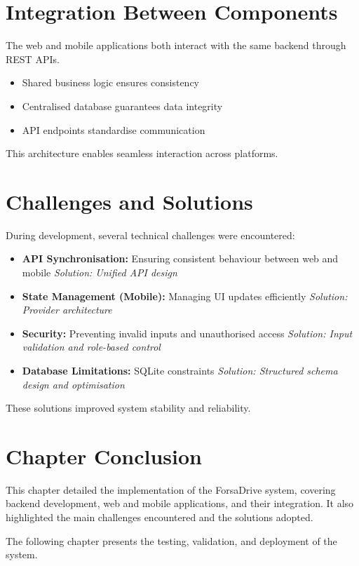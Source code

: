 \section{Integration Between Components}

The web and mobile applications both interact with the same backend through REST APIs.

\begin{itemize}[noitemsep]
    \item Shared business logic ensures consistency
    \item Centralised database guarantees data integrity
    \item API endpoints standardise communication
\end{itemize}

This architecture enables seamless interaction across platforms.

\section{Challenges and Solutions}

During development, several technical challenges were encountered:

\begin{itemize}[noitemsep]
    \item \textbf{API Synchronisation:} Ensuring consistent behaviour between web and mobile  
    \textit{Solution: Unified API design}
    
    \item \textbf{State Management (Mobile):} Managing UI updates efficiently  
    \textit{Solution: Provider architecture}
    
    \item \textbf{Security:} Preventing invalid inputs and unauthorised access  
    \textit{Solution: Input validation and role-based control}
    
    \item \textbf{Database Limitations:} SQLite constraints  
    \textit{Solution: Structured schema design and optimisation}
\end{itemize}

These solutions improved system stability and reliability.

\section*{Chapter Conclusion}

This chapter detailed the implementation of the ForsaDrive system, covering backend development, web and mobile applications, and their integration. It also highlighted the main challenges encountered and the solutions adopted.

The following chapter presents the testing, validation, and deployment of the system.